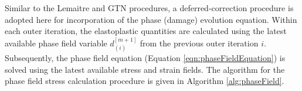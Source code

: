 \documentclass[sn-mathphys,Numbered,draft]{sn-jnl}%
\begin{document}

Similar to the Lemaitre and GTN procedures, a deferred-correction procedure is adopted here for incorporation of the phase (damage) evolution equation.
Within each outer iteration, the elastoplastic quantities are calculated using the latest available phase field variable $d^{[m+1]}_{(i)}$ from the previous outer iteration $i$.
Subsequently, the phase field equation (Equation \ref{eqn:phaseFieldEquation}) is solved using the latest available stress and strain fields.
The algorithm for the phase field stress calculation procedure is given in Algorithm \ref{alg:phaseField}.
\end{document}
